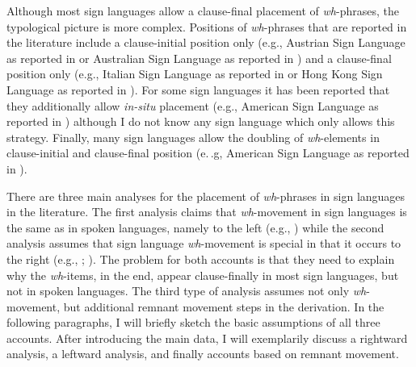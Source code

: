 Although most sign languages allow a clause-final placement of \textit{wh}-phrases, the typological picture is more complex. Positions of \textit{wh}-phrases that are reported in the literature include a clause-initial position only (e.g., Austrian Sign Language as reported in \citealt{schalber2006chin} or Australian Sign Language as reported in \citealt{johnston2007australian}) and a clause-final position only (e.g., Italian Sign Language as reported in \citealt{cecchetto2009another} or Hong Kong Sign Language as reported in \citealt{tang2006questions}). For some sign languages it has been reported that they additionally allow \textit{in-situ} placement (e.g., American Sign Language as reported in \citealt{neidle2000syntax}) although I do not know any sign language which only allows this strategy. Finally, many sign languages allow the doubling of \textit{wh}-elements in clause-initial and clause-final position (e.\,.g, American Sign Language as reported in \citealt{neidle2000syntax}).

There are three main analyses for the placement of \textit{wh}-phrases in sign languages in the literature. The first analysis claims that \textit{wh}-movement in sign languages is the same as in spoken languages, namely to the left (e.g., \citealt{petronio1997}) while the second analysis assumes that sign language \textit{wh}-movement is special in that it occurs to the right (e.g., \citealt{aarons1992clausal}; \citealt{cecchetto2009another}). The problem for both accounts is that they need to explain why the \textit{wh}-items, in the end, appear clause-finally in most sign languages, but not in spoken languages. The third type of analysis assumes not only \textit{wh}-movement, but additional remnant movement steps in the derivation. In the following paragraphs, I will briefly sketch the basic assumptions of all three accounts. After introducing the main data, I will exemplarily discuss a rightward analysis, a leftward analysis, and finally  accounts based on remnant movement. 

